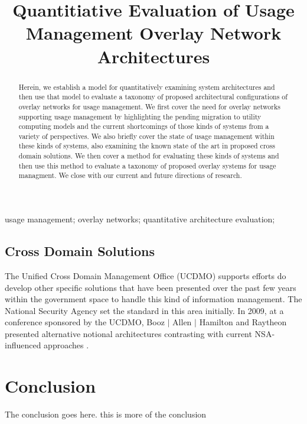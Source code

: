 \documentclass[10pt, conference, compsocconf]{IEEEtran}
\begin{document}
\title{Quantitiative Evaluation of Usage Management Overlay Network Architectures}

\author{
\and
{}
}

\maketitle


\begin{abstract}
Herein, we establish a model for quantitatively examining system architectures and then use that model to evaluate a taxonomy of proposed architectural configurations of overlay networks for usage management.
We first cover the need for overlay networks supporting usage management by highlighting the pending migration to utility computing models and the current shortcomings of those kinds of systems from a variety of perspectives.  We also briefly cover the state of usage management within these kinds of systems, also examining the known state of the art in proposed cross domain solutions.  We then cover a method for evaluating these kinds of systems and then use this method to evaluate a taxonomy of proposed overlay systems for usage managment.  We close with our current and future directions of research. 
\end{abstract}

\begin{IEEEkeywords}
usage management; overlay networks; quantitative architecture evaluation;

\end{IEEEkeywords}

\IEEEpeerreviewmaketitle




\subsection{Cross Domain Solutions}
The Unified Cross Domain Management Office (UCDMO) supports efforts do develop other specific solutions that have been presented over the past few years within the government space to handle this kind of information management.  The National Security Agency set the standard in this area initially.  In 2009, at a conference sponsored by the UCDMO, Booz $\mid$ Allen $\mid$ Hamilton and Raytheon presented alternative notional architectures contrasting with current NSA-influenced approaches \cite{proposal:nsa-arch,proposal:gig-arch,proposal:bah-arch,proposal:raytheon-arch}.



\section{Conclusion}
The conclusion goes here. this is more of the conclusion



\end{document}

